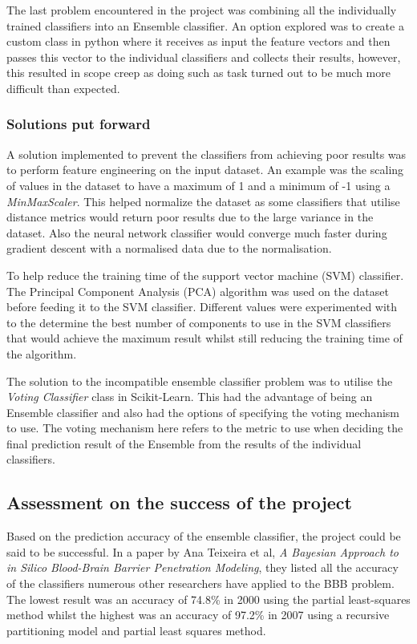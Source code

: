 \documentclass[a4paper,12pt]{article}
\begin{document}
	The last problem encountered in the project was combining all the individually trained classifiers into an Ensemble classifier. An option explored was to create a custom class in python where it receives as input the feature vectors and then passes this vector to the individual classifiers and collects their results, however, this resulted in scope creep as doing such as task turned out to be much more difficult than expected. 
	
		\subsubsection{Solutions put forward}
		A solution implemented to prevent the classifiers from achieving poor results was to perform feature engineering on the input dataset. An example was the scaling of values in the dataset to have a maximum of 1 and a minimum of -1 using a \textit{MinMaxScaler}. This helped normalize the dataset as some classifiers that utilise distance metrics would return poor results due to the large variance in the dataset. Also the neural network classifier would converge much faster during gradient descent with a normalised data due to the normalisation.
		
		To help reduce the training time of the support vector machine (SVM) classifier. The Principal Component Analysis (PCA) algorithm was used on the dataset before feeding it to the SVM classifier. Different values were experimented with to the determine the best number of components to use in the SVM classifiers that would achieve the maximum result whilst still reducing the training time of the algorithm.
		
		The solution to the incompatible ensemble classifier problem was to utilise the \textit{Voting Classifier} class in Scikit-Learn. This had the advantage of being an Ensemble classifier and also had the options of specifying the voting mechanism to use. The voting mechanism here refers to the metric to use when deciding the final prediction result of the Ensemble from the results of the individual classifiers.
		
	\subsection{Assessment on the success of the project}
		Based on the prediction accuracy of the ensemble classifier, the project could be said to be successful. In a paper by Ana Teixeira et al, \textit{A Bayesian Approach to in Silico Blood-Brain Barrier Penetration Modeling}, they listed all the accuracy of the classifiers numerous other researchers have applied to the BBB problem. The lowest result was an accuracy of 74.8\% in 2000 using the partial least-squares method whilst the highest was an accuracy of 97.2\% in 2007 using a recursive partitioning model and partial least squares method. 
		
\end{document}
